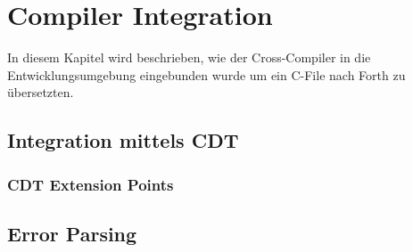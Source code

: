 \chapter{Compiler Integration}

In diesem Kapitel wird beschrieben, wie der Cross-Compiler in die Entwicklungsumgebung eingebunden wurde um ein C-File nach Forth zu übersetzten.

\section{Integration mittels CDT}

\subsection{CDT Extension Points}

\section{Error Parsing}

